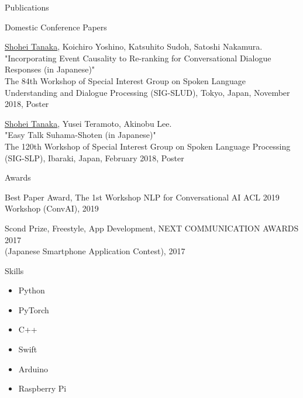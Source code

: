 \documentclass{resume} %
\begin{document}
\begin{rSection}{Publications}
\begin{rSubsection}{Domestic Conference Papers}{}{}{}
\item \underline{Shohei Tanaka}, Koichiro Yoshino, Katsuhito Sudoh, Satoshi Nakamura.
\\"Incorporating Event Causality to Re-ranking for Conversational Dialogue Responses (in Japanese)"
\\The 84th Workshop of Special Interest Group on Spoken Language Understanding and Dialogue Processing (SIG-SLUD), Tokyo, Japan, November 2018, Poster

\item \underline{Shohei Tanaka}, Yusei Teramoto, Akinobu Lee.
\\"Easy Talk Suhama-Shoten (in Japanese)"
\\The 120th Workshop of Special Interest Group on Spoken Language Processing (SIG-SLP), Ibaraki, Japan, February 2018, Poster
\end{rSubsection}

\end{rSection}


\begin{rSection}{Awards}

\begin{rSubsection}{}{}{}{}
    \item Best Paper Award, The 1st Workshop NLP for Conversational AI ACL 2019 Workshop (ConvAI), 2019
    \item Scond Prize, Freestyle, App Development, NEXT COMMUNICATION AWARDS 2017
    \\(Japanese Smartphone Application Contest), 2017
\end{rSubsection}

\end{rSection}


\begin{rSection}{Skills}

\begin{multicols}{3}
\begin{itemize}
    \item Python
    \item PyTorch
    \item C++
    \item Swift
    \item Arduino
    \item Raspberry Pi
\end{itemize}
\end{multicols}

\end{rSection}
\end{document}
